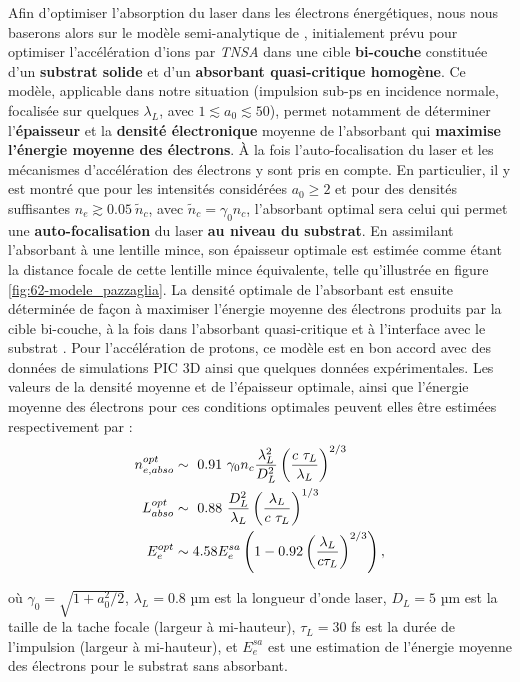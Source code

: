 \begin{refsection}
Afin d'optimiser l'absorption du laser dans les électrons énergétiques, nous nous baserons alors sur le modèle semi-analytique de \cite{pazzaglia_2020}, initialement prévu pour optimiser l'accélération d'ions par \textit{TNSA} dans une cible \textbf{bi-couche} constituée d'un \textbf{substrat solide} et d'un \textbf{absorbant quasi-critique homogène}. Ce modèle, applicable dans notre situation (impulsion sub-ps en incidence normale, focalisée sur quelques $\lambda_L$, avec $ 1 \lesssim a_0 \lesssim 50$), permet notamment de déterminer l'\textbf{épaisseur} et la \textbf{densité électronique} moyenne de l'absorbant qui \textbf{maximise l'énergie moyenne des électrons}. À la fois l'auto-focalisation du laser et les mécanismes d'accélération des électrons y sont pris en compte. 
En particulier, il y est montré que pour les intensités considérées $a_0 \geq 2$ et pour des densités suffisantes $n_e \gtrsim 0.05 ~ \tilde{n}_c$, avec $\tilde{n}_c=\gamma_0 n_c$, l'absorbant optimal sera celui qui permet une \textbf{auto-focalisation} du laser \textbf{au niveau du substrat}. 
En assimilant l'absorbant à une lentille mince, son épaisseur optimale est estimée comme étant la distance focale de cette lentille mince équivalente, telle qu'illustrée en figure \ref{fig:62-modele_pazzaglia}. La densité optimale de l'absorbant est ensuite déterminée de façon à maximiser l'énergie moyenne des électrons produits par la cible bi-couche, à la fois dans l'absorbant quasi-critique et à l'interface avec le substrat \parencite{pazzaglia_2020}. Pour l'accélération de protons, ce modèle est en bon accord avec des données de simulations PIC 3D ainsi que quelques données expérimentales. Les valeurs de la densité moyenne et de l'épaisseur optimale, ainsi que l'énergie moyenne des électrons pour ces conditions optimales peuvent elles être estimées respectivement par :
\begin{equation}
\begin{split}
    n_{e,abso}^{opt}    & \sim ~ 0.91 ~ \gamma_0 n_c \dfrac{\lambda_L^2}{D_{L}^2} \left(\dfrac{c ~ \tau_L}{\lambda_L}\right)^{2/3} \\
    L_{abso}^{opt}      & \sim ~ 0.88 ~ \dfrac{D_L^2}{\lambda_L}\left(\dfrac{\lambda_L}{c ~ \tau_L}\right)^{1/3} \\
    E_e^{opt}           & \sim 4.58 E_e^{sa}\left(1-0.92 \left(\dfrac{\lambda_L}{c \tau_L}\right)^{2/3}\right)
    \rm ,
\end{split}
\end{equation}

où $\gamma_0=\sqrt{1+a_0^2/2}$, $\lambda_L=0.8$ µm est la longueur d'onde laser, $D_L=5$ µm est la taille de la tache focale (largeur à mi-hauteur), $\tau_L=30$ fs est la durée de l'impulsion (largeur à mi-hauteur), et $E_e^{sa}$ est une estimation de l'énergie moyenne des électrons pour le substrat sans absorbant. 


\end{refsection}
